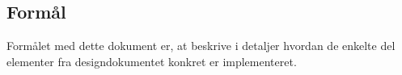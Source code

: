 \subsection{Formål}
Formålet med dette dokument er, at beskrive i detaljer hvordan de enkelte del elementer fra designdokumentet konkret er implementeret. 